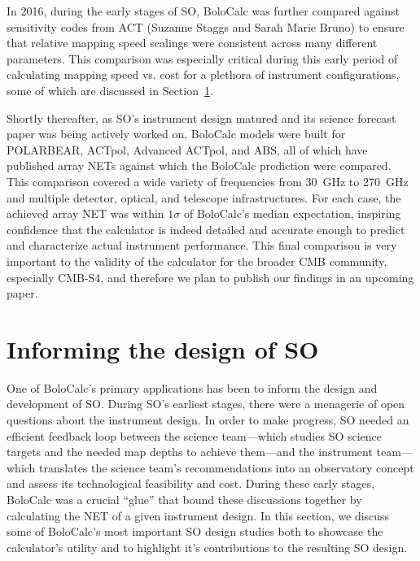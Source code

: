 In 2016, during the early stages of SO, BoloCalc was further compared against sensitivity codes from ACT (Suzanne Staggs and Sarah Marie Bruno) to ensure that relative mapping speed scalings were consistent across many different parameters. This comparison was especially critical during this early period of calculating mapping speed vs. cost for a plethora of instrument configurations, some of which are discussed in Section~\ref{sec:bolocalc_informing_so_design}.

Shortly thereafter, as SO's instrument design matured and its science forecast paper was being actively worked on, BoloCalc models were built for POLARBEAR, ACTpol, Advanced ACTpol, and ABS, all of which have published array NETs against which the BoloCalc prediction were compared. This comparison covered a wide variety of frequencies from 30~GHz to 270~GHz and multiple detector, optical, and telescope infrastructures. For each case, the achieved array NET was within $1 \sigma$ of BoloCalc's median expectation, inspiring confidence that the calculator is indeed detailed and accurate enough to predict and characterize actual instrument performance. This final comparison is very important to the validity of the calculator for the broader CMB community, especially CMB-S4, and therefore we plan to publish our findings in an upcoming paper.


\section{Informing the design of SO}
\label{sec:bolocalc_informing_so_design}

One of BoloCalc's primary applications has been to inform the design and development of SO. During SO's earliest stages, there were a menagerie of open questions about the instrument design. In order to make progress, SO needed an efficient feedback loop between the science team---which studies SO science targets and the needed map depths to achieve them---and the instrument team---which translates the science team's recommendations into an observatory concept and assess its technological feasibility and cost. During these early stages, BoloCalc was a crucial ``glue'' that bound these discussions together by calculating the NET of a given instrument design. In this section, we discuss some of BoloCalc's most important SO design studies both to showcase the calculator's utility and to highlight it's contributions to the resulting SO design. 


